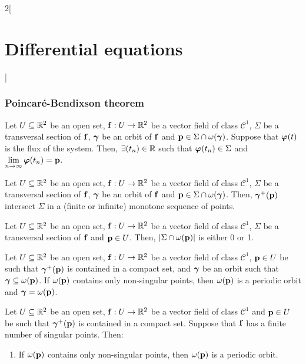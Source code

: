 \documentclass[../../../main.tex]{subfiles}
\begin{document}
\begin{multicols}{2}[\section{Differential equations}]
  \subsubsection{Poincaré-Bendixson theorem}
  \begin{lemma}
    Let $U\subseteq \mathbb{R}^2$ be an open set, $\boldsymbol{\mathrm{f}}:U\rightarrow\mathbb{R}^2$ be a vector field of class $\mathcal{C}^1$, $\Sigma$ be a transversal section of $\boldsymbol{\mathrm{f}}$, $\boldsymbol{\mathrm{\gamma}}$ be an orbit of $\boldsymbol{\mathrm{f}}$ and $\boldsymbol{\mathrm{p}}\in\Sigma\cap\omega(\boldsymbol{\mathrm{\gamma}})$. Suppose that $\boldsymbol{\mathrm{\varphi}}(t)$ is the flux of the system. Then, $\exists (t_n)\in\mathbb{R}$ such that $\boldsymbol{\mathrm{\varphi}}(t_n)\in\Sigma$ and $\displaystyle\lim_{n\to\infty}\boldsymbol{\mathrm{\varphi}}(t_n)=\boldsymbol{\mathrm{p}}$.
  \end{lemma}
  \begin{lemma}
    Let $U\subseteq \mathbb{R}^2$ be an open set, $\boldsymbol{\mathrm{f}}:U\rightarrow\mathbb{R}^2$ be a vector field of class $\mathcal{C}^1$, $\Sigma$ be a transversal section of $\boldsymbol{\mathrm{f}}$, $\boldsymbol{\mathrm{\gamma}}$ be an orbit of $\boldsymbol{\mathrm{f}}$ and $\boldsymbol{\mathrm{p}}\in\Sigma\cap\omega(\boldsymbol{\mathrm{\gamma}})$. Then, ${\boldsymbol{\mathrm{\gamma}}}^+(\boldsymbol{\mathrm{p}})$ intersect $\Sigma$ in a (finite or infinite) monotone sequence of points.
  \end{lemma}
  \begin{lemma}
    Let $U\subseteq \mathbb{R}^2$ be an open set, $\boldsymbol{\mathrm{f}}:U\rightarrow\mathbb{R}^2$ be a vector field of class $\mathcal{C}^1$, $\Sigma$ be a transversal section of $\boldsymbol{\mathrm{f}}$ and $\boldsymbol{\mathrm{p}}\in U$. Then, $\left|\Sigma\cap\omega(\boldsymbol{\mathrm{p}})\right|$ is either 0 or 1.
  \end{lemma}
  \begin{lemma}
    Let $U\subseteq \mathbb{R}^2$ be an open set, $\boldsymbol{\mathrm{f}}:U\rightarrow\mathbb{R}^2$ be a vector field of class $\mathcal{C}^1$, $\boldsymbol{\mathrm{p}}\in U$ be such that ${\boldsymbol{\mathrm{\gamma}}}^+(\boldsymbol{\mathrm{p}})$ is contained in a compact set, and $\boldsymbol{\mathrm{\gamma}}$ be an orbit such that $\boldsymbol{\mathrm{\gamma}}\subseteq \omega(\boldsymbol{\mathrm{p}})$. If $\omega(\boldsymbol{\mathrm{p}})$ contains only non-singular points, then $\omega(\boldsymbol{\mathrm{p}})$ is a periodic orbit and $\boldsymbol{\mathrm{\gamma}}=\omega(\boldsymbol{\mathrm{p}})$.
  \end{lemma}
  \begin{theorem}
    Let $U\subseteq \mathbb{R}^2$ be an open set, $\boldsymbol{\mathrm{f}}:U\rightarrow\mathbb{R}^2$ be a vector field of class $\mathcal{C}^1$ and $\boldsymbol{\mathrm{p}}\in U$ be such that ${\boldsymbol{\mathrm{\gamma}}}^+(\boldsymbol{\mathrm{p}})$ is contained in a compact set. Suppose that $\boldsymbol{\mathrm{f}}$ has a finite number of singular points. Then:
    \begin{enumerate}
      \item If $\omega(\boldsymbol{\mathrm{p}})$ contains only non-singular points, then $\omega(\boldsymbol{\mathrm{p}})$ is a periodic orbit.

\end{enumerate}
\end{theorem}
\end{multicols}
\end{document}
